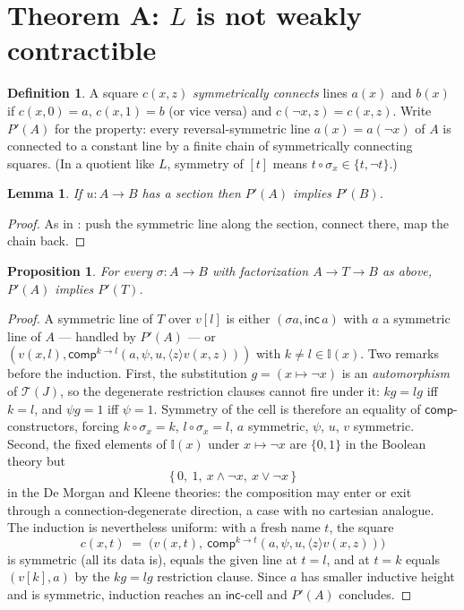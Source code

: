 \documentclass[11pt]{amsart}
\newtheorem{lem}[thm]{Lemma}
\newtheorem{prop}[thm]{Proposition}
\theoremstyle{definition}
\newtheorem{defi}[thm]{Definition}
\newcommand{\I}{\mathbb{I}}
\newcommand{\comp}{\mathsf{comp}}
\newcommand{\inc}{\mathsf{inc}}
\newcommand{\Ldash}{L}
\begin{document}
\section{Theorem A: $\Ldash$ is not weakly contractible}
\label{sec:nogo}

\begin{defi}
  A square $c(x, z)$ \emph{symmetrically connects} lines $a(x)$ and
  $b(x)$ if $c(x, 0) = a$, $c(x,1) = b$ (or vice versa) and
  $c(\neg x, z) = c(x, z)$.  Write $P'(A)$ for the property: every
  reversal-symmetric line $a(x) = a(\neg x)$ of $A$ is connected to
  a constant line by a finite chain of symmetrically connecting
  squares.  (In a quotient like $\Ldash$, symmetry of $[t]$ means
  $t \circ \sigma_x \in \{t, \neg t\}$.)
\end{defi}

\begin{lem}
  \label{lem:section}
  If $u : A \to B$ has a section then $P'(A)$ implies $P'(B)$.
\end{lem}

\begin{proof}
  As in \cite[Lem.~4.1]{CoqNote}: push the symmetric line along the
  section, connect there, map the chain back.
\end{proof}

\begin{prop}
  \label{prop:pres}
  For every $\sigma : A \to B$ with factorization $A \to T \to B$
  as above, $P'(A)$ implies $P'(T)$.
\end{prop}

\begin{proof}
  A symmetric line of $T$ over $v[l]$ is either
  $(\sigma a, \inc\, a)$ with $a$ a symmetric line of $A$ ---
  handled by $P'(A)$ --- or
  $(v(x, l), \comp^{k \to l}(a, \psi, u, \langle z\rangle v(x,z)))$
  with $k \neq l \in \I(x)$.  Two remarks before the induction.
  First, the substitution $g = (x \mapsto \neg x)$ is an
  \emph{automorphism} of $\mathcal{T}(J)$, so the degenerate
  restriction clauses cannot fire under it: $kg = lg$ iff $k = l$,
  and $\psi g = 1$ iff $\psi = 1$.  Symmetry of the cell is
  therefore an equality of $\comp$-constructors, forcing
  $k \circ \sigma_x = k$, $l \circ \sigma_x = l$, $a$ symmetric,
  $\psi$, $u$, $v$ symmetric.  Second, the fixed elements of
  $\I(x)$ under $x \mapsto \neg x$ are $\{0, 1\}$ in the Boolean
  theory but
  \[
    \{\,0,\ 1,\ x \wedge \neg x,\ x \vee \neg x\,\}
  \]
  in the De Morgan and Kleene theories: the composition may enter
  or exit through a connection-degenerate direction, a case with no
  cartesian analogue.  The induction is nevertheless uniform: with
  a fresh name $t$, the square
  \[
    c(x, t) \;=\;
    \bigl(v(x,t),\ \comp^{k \to t}(a, \psi, u,
    \langle z\rangle v(x,z))\bigr)
  \]
  is symmetric (all its data is), equals the given line at $t = l$,
  and at $t = k$ equals $(v[k], a)$ by the $kg = lg$ restriction
  clause.  Since $a$ has smaller inductive height and is symmetric,
  induction reaches an $\inc$-cell and $P'(A)$ concludes.
\end{proof}
\end{document}
